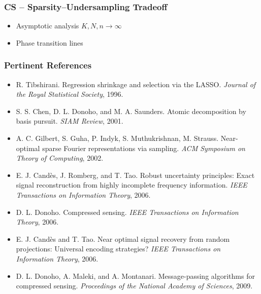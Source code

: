 
\begin{frame} \frametitle{CS -- Sparsity–Undersampling Tradeoff}
\begin{center}  \end{center}
\vfill
\begin{itemize}
\item Asymptotic analysis $K, N, n \rightarrow \infty$
\item Phase transition lines
\end{itemize}
\end{frame}


\begin{frame}
\frametitle{Pertinent References}
\begin{footnotesize}
\begin{itemize}
\item
R. Tibshirani.
Regression shrinkage and selection via the LASSO.
\emph{Journal of the Royal Statistical Society}, 1996.

\item
S. S. Chen, D. L. Donoho, and M. A. Saunders.
Atomic decomposition by basis pursuit.
\emph{SIAM Review}, 2001.

\item
A. C. Gilbert, S. Guha, P. Indyk, S. Muthukrishnan, M. Strauss.
Near-optimal sparse Fourier representations via sampling.
\emph{ACM Symposium on Theory of Computing}, 2002.

\item
E. J. Cand\`{e}s, J. Romberg, and T. Tao.
Robust uncertainty principles: Exact signal reconstruction from highly incomplete frequency information.
\emph{IEEE Transactions on Information Theory}, 2006.

\item
D. L. Donoho.
Compressed sensing. 
\emph{IEEE Transactions on Information Theory}, 2006.

\item
E. J. Cand\`{e}s and T. Tao.
Near optimal signal recovery from random projections: Universal encoding strategies?
\emph{IEEE Transactions on Information Theory}, 2006.

\item
D. L. Donoho, A. Maleki, and A. Montanari.
Message-passing algorithms for compressed sensing.
\emph{Proceedings of the National Academy of Sciences}, 2009.
\end{itemize}
\end{footnotesize}
\end{frame}

